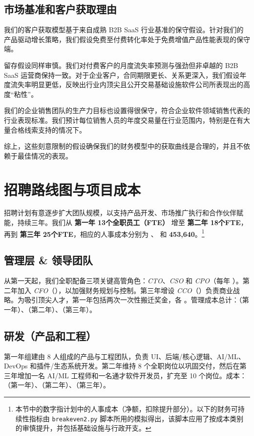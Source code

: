 \documentclass[11点, A4纸, 单面]{article}
\begin{document}
\subsection{市场基准和客户获取理由}

我们的客户获取模型基于来自成熟 B2B SaaS 行业基准的保守假设。针对我们的产品驱动增长策略，我们假设免费至付费转化率处于免费增值产品性能表现的保守端。

留存假设同样审慎。我们对付费客户的月度流失率预测与强劲但非卓越的 B2B SaaS 运营商保持一致。对于企业客户，合同期限更长、关系更深入，我们假设年度流失率明显更低，反映出行业内顶尖且公开交易基础设施软件公司所表现出的高度“粘性”。

我们的企业销售团队的生产力目标也设置得很保守，符合企业软件领域销售代表的行业表现标准。我们预计每位销售人员的年度交易量在行业范围内，特别是在有大量合格线索支持的情况下。

综上，这些刻意限制的假设确保我们的财务模型中的获取曲线是合理的，并且不依赖于最佳情况的表现。

\newpage
\section{招聘路线图与项目成本}
\label{sec:hiring-roadmap}

招聘计划有意逐步扩大团队规模，以支持产品开发、市场推广执行和合作伙伴赋能，持续三年。我们从 \textbf{第一年 13个全职员工（FTE）} 增至 \textbf{第二年 18个FTE}，再到 \textbf{第三年 25个FTE}，相应的人事成本分别为 \textbf{}、\textbf{} 和 \textbf{453{,}640}。\footnote{本节中的数字指计划中的人事成本（净额，扣除提升部分）。以下的财务可持续性指标由 \texttt{breakeven2.py} 脚本所用的模拟得出，该脚本应用了按成本类别的审慎提升，并包括基础设施与行政开支。}

\subsection{管理层 \& 领导团队}
从第一天起，我们全职配备三项关键高管角色：\textit{CTO}、\textit{CSO} 和 \textit{CPO}（每年 ）。第二年加入 \textit{CFO}（），以加强财务规划与控制。第三年增设 \textit{CCO}（）负责商业战略。为吸引顶尖人才，第一年包括两次一次性搬迁奖金，各 。管理成本总计：\textbf{}（第一年）、\textbf{}（第二年）、\textbf{}（第三年）。

\subsection{研发（产品和工程）}
第一年组建由 8 人组成的产品与工程团队，负责 UI、后端/核心逻辑、AI/ML、DevOps 和插件/生态系统开发。第二年维持 8 个全职岗位以巩固交付，然后在第三年增加一名 AI/ML 工程师和一名通才软件开发员，扩充至 10 个岗位。成本：\textbf{}（第一年）、\textbf{}（第二年）、\textbf{}（第三年）。
\end{document}
